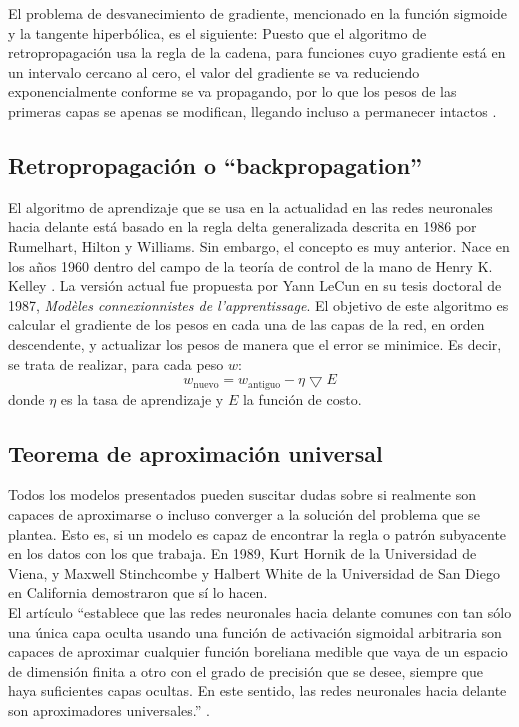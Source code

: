 \documentclass[11pt,twoside,titlepage,a4paper]{article}
\numberwithin{equation}{section} %
\theoremstyle{usual}
\begin{document}
El problema de desvanecimiento de gradiente, mencionado en la
función sigmoide y la tangente hiperbólica, es el siguiente: Puesto 
que el algoritmo de retropropagación usa la regla de la cadena, para
funciones cuyo gradiente está en un intervalo cercano al cero, el 
valor del gradiente se va reduciendo exponencialmente conforme se va
propagando, por lo que los pesos de las primeras capas se apenas se 
modifican, llegando incluso a permanecer intactos \cite{vanishing}.

\subsection{Retropropagación o ``backpropagation''}

El algoritmo de aprendizaje que se usa en la actualidad en las redes 
neuronales hacia delante está basado en la regla delta generalizada descrita 
en 1986 por Rumelhart, Hilton y Williams. Sin embargo, el concepto es muy
anterior. Nace en los años 1960 dentro del campo de la teoría de control de
la mano de Henry K. Kelley \cite{kelley}. La versión actual fue propuesta
por Yann LeCun en su tesis doctoral de 1987, \textit{	
Modèles connexionnistes de l'apprentissage}. El objetivo de este algoritmo es 
calcular el gradiente de los pesos en cada una de las capas de la red, en 
orden descendente, y actualizar los pesos de manera que el error se minimice.
Es decir, se trata de realizar, para cada peso $w$:
\begin{equation}
    w_{\text{nuevo}}=w_{\text{antiguo}}-\eta\bigtriangledown E
\end{equation}    
donde $\eta$ es la tasa de aprendizaje y $E$ la función de costo.

\subsection{Teorema de aproximación universal}

Todos los modelos presentados pueden suscitar dudas sobre si
realmente son capaces de aproximarse o incluso converger a la
solución del problema que se plantea. Esto es, si un modelo es capaz
de encontrar la regla o patrón subyacente en los datos con los que
trabaja. En 1989, Kurt Hornik de la Universidad de Viena, y Maxwell 
Stinchcombe y Halbert White de la Universidad de San Diego en 
California demostraron que sí lo hacen. \\

El artículo ``establece que las redes neuronales hacia delante 
comunes con tan sólo una única capa oculta usando una función de 
activación sigmoidal arbitraria son capaces de aproximar cualquier 
función boreliana medible que vaya de un espacio de dimensión finita
a otro con el grado de precisión que se desee, siempre que haya 
suficientes capas ocultas. En este sentido, las redes neuronales 
hacia delante son aproximadores universales.'' 
\cite{aproximator-original}. \\
\end{document}
